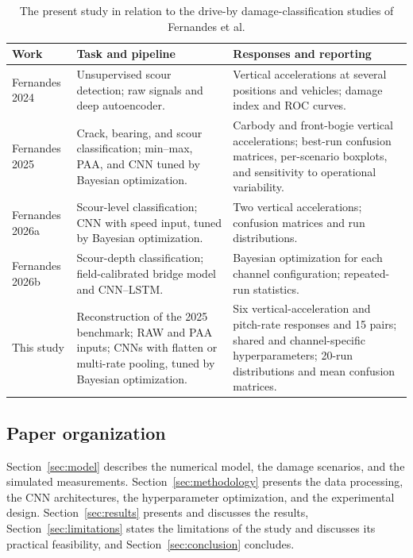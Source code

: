 \begin{table}[htbp]
\centering
\caption{The present study in relation to the drive-by damage-classification
studies of Fernandes et al.}
\label{tab:delta}
\small
\setlength{\tabcolsep}{3pt}
\begin{tabular}{@{}>{\raggedright\arraybackslash}p{}
>{\raggedright\arraybackslash}p{}
>{\raggedright\arraybackslash}p{}@{}}
\toprule
Work & Task and pipeline & Responses and reporting \\
\midrule
Fernandes 2024~\cite{fernandes2024driveby} & Unsupervised scour detection;
raw signals and deep autoencoder. & Vertical accelerations at several positions
and vehicles; damage index and ROC curves. \\
\addlinespace
Fernandes 2025~\cite{fernandes2025early} & Crack, bearing, and scour
classification; min--max, PAA, and CNN tuned by Bayesian optimization. &
Carbody and front-bogie vertical accelerations; best-run confusion matrices,
per-scenario boxplots, and sensitivity to operational variability. \\
\addlinespace
Fernandes 2026a~\cite{fernandes2026early} & Scour-level classification; CNN
with speed input, tuned by Bayesian optimization. & Two vertical accelerations;
confusion matrices and run distributions. \\
\addlinespace
Fernandes 2026b~\cite{fernandes2026canelas} & Scour-depth classification;
field-calibrated bridge model and CNN--LSTM. & Bayesian optimization for each
channel configuration; repeated-run statistics. \\
\addlinespace
This study & Reconstruction of the 2025 benchmark; RAW and PAA inputs; CNNs
with flatten or multi-rate pooling, tuned by Bayesian optimization. & Six
vertical-acceleration and pitch-rate responses and 15 pairs; shared and
channel-specific hyperparameters; 20-run distributions and mean confusion
matrices. \\
\bottomrule
\end{tabular}
\end{table}

\subsection{Paper organization}

Section~\ref{sec:model} describes the numerical model, the damage scenarios,
and the simulated measurements. Section~\ref{sec:methodology} presents the data
processing, the CNN architectures, the hyperparameter optimization, and the
experimental design. Section~\ref{sec:results} presents and discusses the
results, Section~\ref{sec:limitations} states the limitations of the study and
discusses its practical feasibility, and Section~\ref{sec:conclusion}
concludes.
